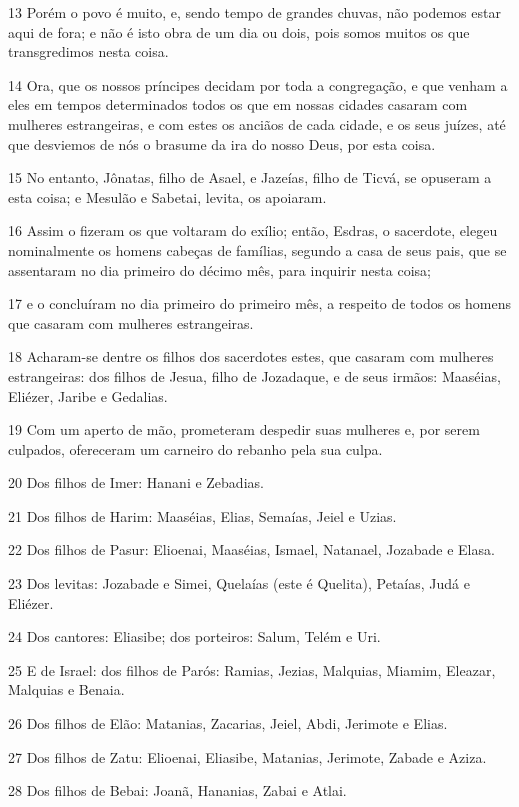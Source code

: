\par 13 Porém o povo é muito, e, sendo tempo de grandes chuvas, não podemos estar aqui de fora; e não é isto obra de um dia ou dois, pois somos muitos os que transgredimos nesta coisa.
\par 14 Ora, que os nossos príncipes decidam por toda a congregação, e que venham a eles em tempos determinados todos os que em nossas cidades casaram com mulheres estrangeiras, e com estes os anciãos de cada cidade, e os seus juízes, até que desviemos de nós o brasume da ira do nosso Deus, por esta coisa.
\par 15 No entanto, Jônatas, filho de Asael, e Jazeías, filho de Ticvá, se opuseram a esta coisa; e Mesulão e Sabetai, levita, os apoiaram.
\par 16 Assim o fizeram os que voltaram do exílio; então, Esdras, o sacerdote, elegeu nominalmente os homens cabeças de famílias, segundo a casa de seus pais, que se assentaram no dia primeiro do décimo mês, para inquirir nesta coisa;
\par 17 e o concluíram no dia primeiro do primeiro mês, a respeito de todos os homens que casaram com mulheres estrangeiras.
\par 18 Acharam-se dentre os filhos dos sacerdotes estes, que casaram com mulheres estrangeiras: dos filhos de Jesua, filho de Jozadaque, e de seus irmãos: Maaséias, Eliézer, Jaribe e Gedalias.
\par 19 Com um aperto de mão, prometeram despedir suas mulheres e, por serem culpados, ofereceram um carneiro do rebanho pela sua culpa.
\par 20 Dos filhos de Imer: Hanani e Zebadias.
\par 21 Dos filhos de Harim: Maaséias, Elias, Semaías, Jeiel e Uzias.
\par 22 Dos filhos de Pasur: Elioenai, Maaséias, Ismael, Natanael, Jozabade e Elasa.
\par 23 Dos levitas: Jozabade e Simei, Quelaías (este é Quelita), Petaías, Judá e Eliézer.
\par 24 Dos cantores: Eliasibe; dos porteiros: Salum, Telém e Uri.
\par 25 E de Israel: dos filhos de Parós: Ramias, Jezias, Malquias, Miamim, Eleazar, Malquias e Benaia.
\par 26 Dos filhos de Elão: Matanias, Zacarias, Jeiel, Abdi, Jerimote e Elias.
\par 27 Dos filhos de Zatu: Elioenai, Eliasibe, Matanias, Jerimote, Zabade e Aziza.
\par 28 Dos filhos de Bebai: Joanã, Hananias, Zabai e Atlai.
